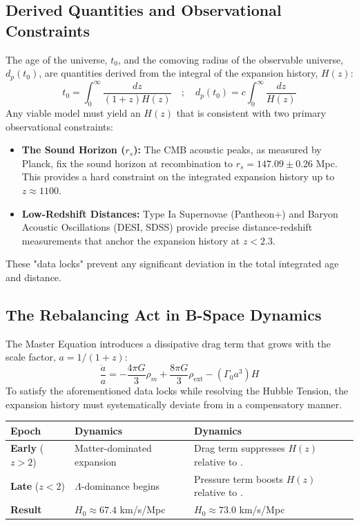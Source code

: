 \documentclass{BSpacePaper} %
\begin{document}
\begin{appendices}
\subsection{Derived Quantities and Observational Constraints}
The age of the universe, $t_0$, and the comoving radius of the observable universe, $d_p(t_0)$, are quantities derived from the integral of the expansion history, $H(z)$:
\begin{equation}
    t_0 = \int_0^\infty \frac{dz}{(1+z)H(z)} \quad ; \quad d_p(t_0) = c \int_0^\infty \frac{dz}{H(z)}
\end{equation}
Any viable model must yield an $H(z)$ that is consistent with two primary observational constraints:
\begin{itemize}
    \item \textbf{The Sound Horizon ($r_s$):} The CMB acoustic peaks, as measured by Planck, fix the sound horizon at recombination to $r_s = 147.09 \pm 0.26$ Mpc. This provides a hard constraint on the integrated expansion history up to $z \approx 1100$.
    \item \textbf{Low-Redshift Distances:} Type Ia Supernovae (Pantheon+) and Baryon Acoustic Oscillations (DESI, SDSS) provide precise distance-redshift measurements that anchor the expansion history at $z < 2.3$.
\end{itemize}
These "data locks" prevent any significant deviation in the total integrated age and distance.

\subsection{The Rebalancing Act in B-Space Dynamics}
The \bspace{} Master Equation introduces a dissipative drag term that grows with the scale factor, $a = 1/(1+z)$:
\begin{equation}
    \frac{\ddot{a}}{a} = -\frac{4\pi G}{3}\rho_m + \frac{8\pi G}{3}\rho_{\text{ext}} - \left(\Gamma_0 a^3\right) H
\end{equation}
To satisfy the aforementioned data locks while resolving the Hubble Tension, the \bspace{} expansion history must systematically deviate from \lcdm{} in a compensatory manner.

\begin{center}
    \captionsetup{type=table}
    \label{tab:rebalancing}
    \begin{tabular}{@{}lll@{}}
    \toprule
    \textbf{Epoch} & \textbf{\lcdm{} Dynamics} & \textbf{\bspace{} Dynamics} \\ \midrule
    \textbf{Early} ($z > 2$) & Matter-dominated expansion & Drag term suppresses $H(z)$ relative to \lcdm{}. \\
    \textbf{Late} ($z < 2$) & \(\Lambda\)-dominance begins & Pressure term boosts $H(z)$ relative to \lcdm{}. \\ 
    \textbf{Result} & $H_0 \approx 67.4$ km/s/Mpc & $H_0 \approx 73.0$ km/s/Mpc \\ \bottomrule
    \end{tabular}
\end{center}


\end{appendices}
\end{document}
